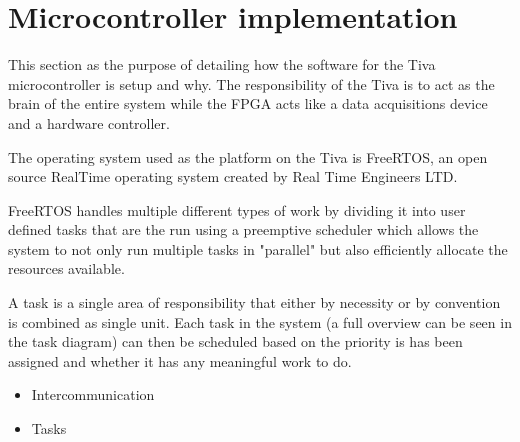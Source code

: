 \documentclass[../../../main]{subfiles}
\begin{document}
\section*{Microcontroller implementation}

This section as the purpose of detailing how the software for the Tiva microcontroller is setup and why. The responsibility of the Tiva is to act as the brain of the entire system while the FPGA acts like a data acquisitions device and a hardware controller. 

The operating system used as the platform on the Tiva is FreeRTOS, an open source RealTime operating system created by Real Time Engineers LTD.

FreeRTOS handles multiple different types of work by dividing it into user defined tasks that are the run using a preemptive scheduler which allows the system to not only run multiple tasks in "parallel" but also efficiently allocate the resources available.


A task is a single area of responsibility that either by necessity or by convention is combined as single unit. Each task in the system (a full overview can be seen in the task diagram) can then be scheduled based on the priority is has been assigned and whether it has any meaningful work to do. 


\begin{itemize}

    \item Intercommunication
    \item Tasks
\end{itemize}
\end{document}

